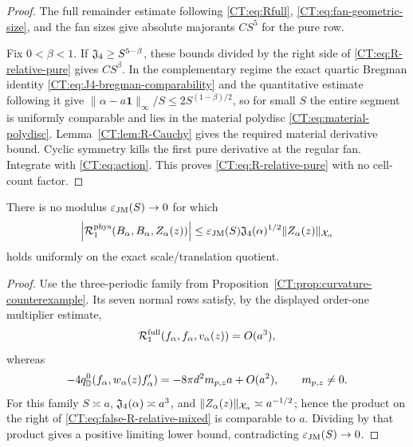\begin{proof}
The full remainder estimate following \eqref{CT:eq:Rfull},
\eqref{CT:eq:fan-geometric-size}, and the fan sizes give absolute majorants
$CS^5$ for the pure row.

Fix $0<\beta<1$.  If $\mathfrak J_4\ge S^{5-\beta}$, these bounds divided by the
right side of \eqref{CT:eq:R-relative-pure} gives $CS^\beta$.
In the complementary regime the exact quartic Bregman identity
\eqref{CT:eq:J4-bregman-comparability} and the quantitative estimate following
it give
$\|\alpha-a\mathbf1\|_\infty/S\le2S^{(1-\beta)/2}$, so for small $S$ the
entire segment is uniformly comparable and lies in the material polydisc
\eqref{CT:eq:material-polydisc}.
Lemma~\ref{CT:lem:R-Cauchy} gives the required material derivative bound.
Cyclic symmetry kills the first pure derivative at the regular fan.
Integrate with \eqref{CT:eq:action}.  This proves
\eqref{CT:eq:R-relative-pure} with no cell-count factor.
\end{proof}

\begin{proposition}[Retraction of CT--JM]
\label{CT:prop:joint-mixed-counterexample}
There is no modulus $\varepsilon_{\rm JM}(S)\to0$ for which
\begin{equation}\label{CT:eq:false-R-relative-mixed}
 \left|\mathcal R_1^{\rm phys}(B_\alpha,B_\alpha,Z_\alpha(z))\right|
 \le\varepsilon_{\rm JM}(S)\mathfrak J_4(\alpha)^{1/2}
       \|Z_\alpha(z)\|_{\mathcal X_\alpha}
\end{equation}
holds uniformly on the exact scale/translation quotient.
\end{proposition}

\begin{proof}
Use the three-periodic family from
Proposition~\ref{CT:prop:curvature-counterexample}.  Its seven normal rows
satisfy, by the displayed order-one multiplier estimate,
\[
 \mathcal R_1^{\rm full}(f_\alpha,f_\alpha,v_\alpha(z))=O(a^3),
\]
whereas
\[
 -4q_{\mathbb D}^{0}(f_\alpha,w_\alpha(z)f_\alpha')
 =-8\pi d^2m_{p,z}a+O(a^2),\qquad m_{p,z}\ne0.
\]
For this family $S\asymp a$,
$\mathfrak J_4(\alpha)\asymp a^3$, and
$\|Z_\alpha(z)\|_{\mathcal X_\alpha}\asymp a^{-1/2}$; hence the product on the
right of \eqref{CT:eq:false-R-relative-mixed} is comparable to $a$.  Dividing
by that product gives a positive limiting lower bound, contradicting
$\varepsilon_{\rm JM}(S)\to0$.
\end{proof}

